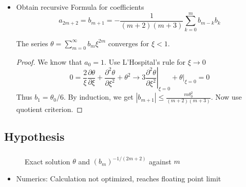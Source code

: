\begin{frame}
	\begin{itemize}[<+->]
		\item Obtain recursive Formula for coefficients
		\begin{equation}
			a_{2m+2}=b_{m+1}= -\frac{1}{(m+2)(m+3)}\sum\limits_{k=0}^mb_{m-k}b_k
		\end{equation}
		\begin{theorem}
			The series $\theta=\sum\limits_{m=0}^\infty b_{m}\xi^{2m}$ converges for $\xi<1$. %
		\end{theorem}
		\begin{proof}
			We know that $a_0=1$. Use L'Hospital's rule for $\xi\rightarrow0$
			\begin{equation}
				0=\frac{2}{\xi}\frac{\partial\theta}{\partial\xi} + \frac{\partial^2\theta}{\partial\xi^2}+\theta^2\longrightarrow3\left.\frac{\partial^2\theta}{\partial\xi^2}\right|_{\xi=0}+\left.\theta\right|_{\xi=0}=0
			\end{equation}
			Thus $b_1=\theta_0/6$. By induction, we get $|b_{m+1}|\leq\frac{m\theta_0^2}{(m+2)(m+3)}$. Now use quotient criterion.
		\end{proof}
	\end{itemize}
\end{frame}

\subsection{Hypothesis}
\begin{frame}
	\frametitle{\insertsubsection}
	\begin{figure}
		\caption{Exact solution $\theta$ and $(b_m)^{-1/(2m+2)}$ against $m$}
	\end{figure}
	\begin{itemize}%
		\begin{theorem}
			The radius of convergence $R$ of the above calculated series is exactly the value at which $\theta(R)=0$.
		\end{theorem}
		\item Numerics: Calculation not optimized, reaches floating point limit
	\end{itemize}
\end{frame}


